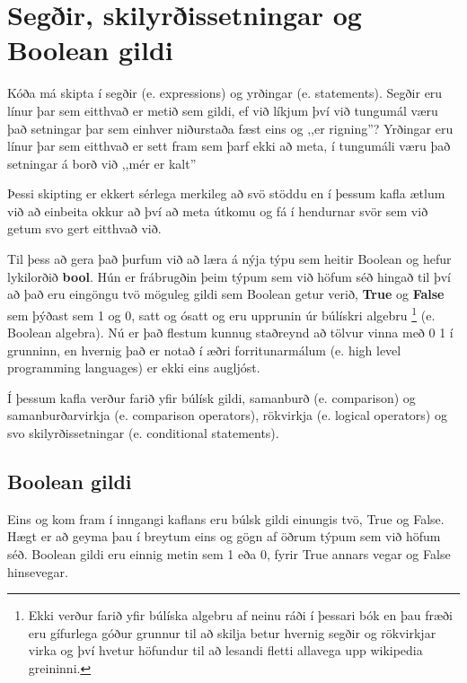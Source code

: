 
\chapter{Segðir, skilyrðissetningar og Boolean gildi}\label{k:segðir}

Kóða má skipta í segðir (e. expressions) og yrðingar (e. statements).
Segðir eru línur þar sem eitthvað er metið sem gildi, ef við líkjum því við tungumál væru það setningar þar sem einhver niðurstaða fæst eins og ,,er rigning''? 
Yrðingar eru línur þar sem eitthvað er sett fram sem þarf ekki að meta, í tungumáli væru það setningar á borð við ,,mér er kalt''

Þessi skipting er ekkert sérlega merkileg að svö stöddu en í þessum kafla ætlum við að einbeita okkur að því að meta útkomu og fá í hendurnar svör sem við getum svo gert eitthvað við.

Til þess að gera það þurfum við að læra á nýja týpu sem heitir Boolean og hefur lykilorðið \textbf{bool}.
Hún er frábrugðin þeim týpum sem við höfum séð hingað til því að það eru eingöngu tvö möguleg gildi sem Boolean getur verið, \textbf{True} og \textbf{False} sem þýðast sem 1 og 0, satt og ósatt og eru upprunin úr búlískri algebru \footnote{Ekki verður farið yfir búlíska algebru af neinu ráði í þessari bók en þau fræði eru gífurlega góður grunnur til að skilja betur hvernig segðir og rökvirkjar virka og því hvetur höfundur til að lesandi fletti allavega upp wikipedia greininni.} (e. Boolean algebra). 
Nú er það flestum kunnug staðreynd að tölvur vinna með 0 1 í grunninn, en hvernig það er notað í æðri forritunarmálum (e. high level programming languages) er ekki eins augljóst.

Í þessum kafla verður farið yfir búlísk gildi, samanburð (e. comparison) og samanburðarvirkja (e. comparison operators), rökvirkja (e. logical operators) og svo skilyrðissetningar (e. conditional statements).

\section{Boolean gildi}

Eins og kom fram í inngangi kaflans eru búlsk gildi einungis tvö, True og False.
Hægt er að geyma þau í breytum eins og gögn af öðrum týpum sem við höfum séð.
Boolean gildi eru einnig metin sem 1 eða 0, fyrir True annars vegar og False hinsevegar.

